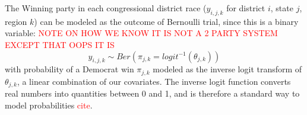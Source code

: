 \documentclass[12pt]{article}
\begin{document}
%
%
%
%

The Winning party in each congressional district race ($y_{i,j,k}$ for district $i$, state $j$, region $k$) can be modeled as the outcome of Bernoulli trial, since this is a binary variable: \textcolor{red}{NOTE ON HOW WE KNOW IT IS NOT A 2 PARTY SYSTEM EXCEPT THAT OOPS IT IS}
\begin{equation}
	y_{i,j,k} \sim Ber \left( \pi_{j,k} = logit^{-1}(\theta_{j,k})  \right)
\end{equation}
with probability of a Democrat win $\pi_{j,k}$ modeled as the inverse logit transform of $\theta_{j,k}$, a linear combination of our covariates. The inverse logit function converts real numbers into quantities between 0 and 1, and is therefore a standard way to model probabilities \textcolor{red}{cite}.
\end{document}
